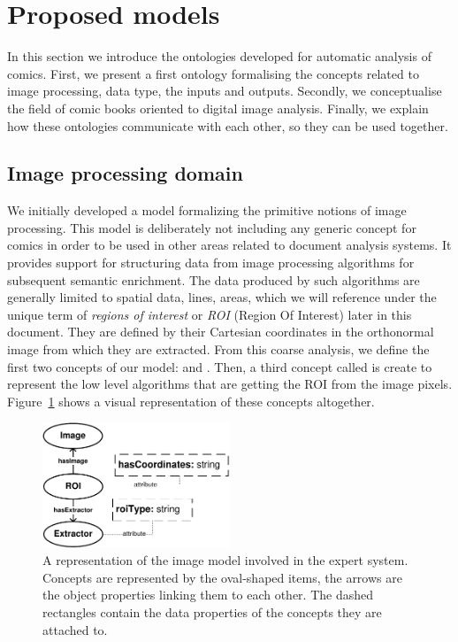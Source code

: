 \section{Proposed models} %
\label{sec:proposed_models}

In this section we introduce the ontologies developed for automatic analysis of comics.
First, we present a first ontology formalising the concepts related to image processing, data type, the inputs and outputs.
Secondly, we conceptualise the field of comic books oriented to digital image analysis.
Finally, we explain how these ontologies communicate with each other, so they can be used together.

\subsection{Image processing domain} %
\label{sub:kn:image_processing_domain}

We initially developed a model formalizing the primitive notions of image processing.
This model is deliberately not including any generic concept for comics in order to be used in other areas related to document analysis systems.
It provides support for structuring data from image processing algorithms for subsequent semantic enrichment.
The data produced by such algorithms are generally limited to spatial data, lines, areas, which we will reference under the unique term of \textit{regions of interest} or \textit{ROI} (Region Of Interest) later in this document.
They are defined by their Cartesian coordinates in the orthonormal image from which they are extracted.
From this coarse analysis, we define the first two concepts of our model:  and .
Then, a third concept called  is create to represent the low level algorithms that are getting the ROI from the image pixels.
Figure~\ref{fig:kn:model_image} shows a visual representation of these concepts altogether.

 \begin{figure}[!ht]
   \centering
  \includegraphics[width=0.5\textwidth]{model_image.pdf}
  \caption[A representation of the image model involved in the expert system]{A representation of the image model involved in the expert system. Concepts are represented by the oval-shaped items, the arrows are the object properties linking them to each other. The dashed rectangles contain the data properties of the concepts they are attached to.}
  \label{fig:kn:model_image}
 \end{figure}


